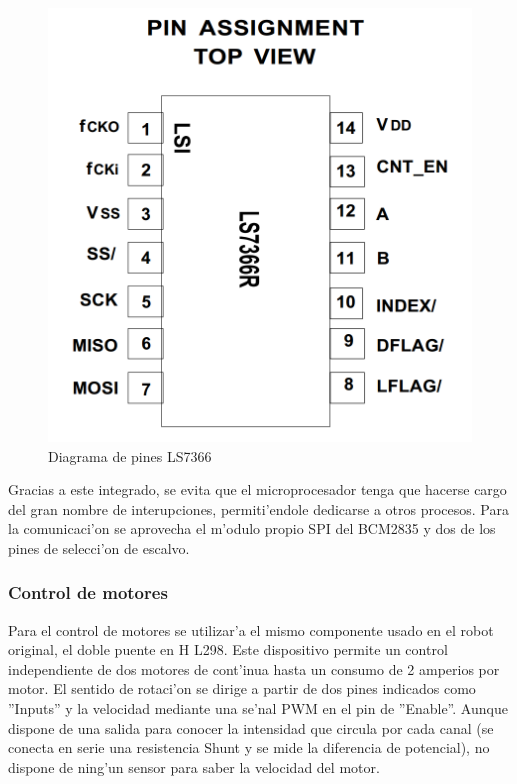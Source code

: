 \documentclass[twoside,12pt]{article}
\begin{document}
\begin{figure}[ht]
\centering
\includegraphics[scale=0.15]{images/LS7366.png} 
\caption{Diagrama de pines LS7366}
\label{fig:LS7366}
\end{figure} 

Gracias a este integrado, se evita que el microprocesador tenga que hacerse cargo del gran nombre de interupciones, permiti'endole dedicarse a otros procesos. Para la comunicaci'on se aprovecha el m'odulo propio SPI del BCM2835 y dos de los pines de selecci'on de escalvo. 

\subsubsection{Control de motores}
Para el control de motores se utilizar'a el mismo componente usado en el robot original, el doble puente en H L298. Este dispositivo permite un control independiente de dos motores de cont'inua hasta un consumo de 2 amperios por motor. El sentido de rotaci'on se dirige a partir de dos pines indicados como ''Inputs'' y la velocidad mediante una se'nal PWM en el pin de ''Enable''. Aunque dispone de una salida para conocer la intensidad que circula por cada canal (se conecta en serie una resistencia Shunt y se mide la diferencia de potencial), no dispone de ning'un sensor para saber la velocidad del motor.\\
\end{document}
